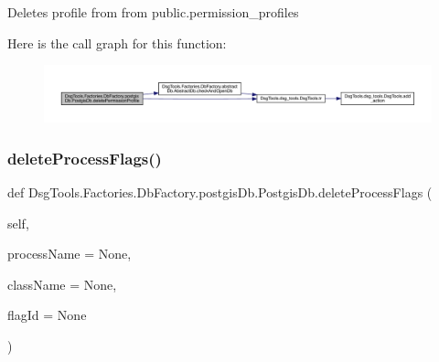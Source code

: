 \begin{DoxyVerb}Deletes profile from from public.permission_profiles
\end{DoxyVerb}
 Here is the call graph for this function\+:
\nopagebreak
\begin{figure}[H]
\begin{center}
\leavevmode
\includegraphics[width=350pt]{class_dsg_tools_1_1_factories_1_1_db_factory_1_1postgis_db_1_1_postgis_db_a8c073034c419bd5513170aceb8d96570_cgraph}
\end{center}
\end{figure}
\mbox{\label{class_dsg_tools_1_1_factories_1_1_db_factory_1_1postgis_db_1_1_postgis_db_a365a91237aedbc24dc4d263d6b572220}} 
\subsubsection{\texorpdfstring{delete\+Process\+Flags()}{deleteProcessFlags()}}
{\footnotesize\ttfamily def Dsg\+Tools.\+Factories.\+Db\+Factory.\+postgis\+Db.\+Postgis\+Db.\+delete\+Process\+Flags (\begin{DoxyParamCaption}\item[{}]{self,  }\item[{}]{process\+Name = {\ttfamily None},  }\item[{}]{class\+Name = {\ttfamily None},  }\item[{}]{flag\+Id = {\ttfamily None} }\end{DoxyParamCaption})}

